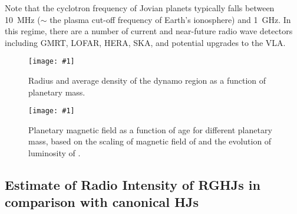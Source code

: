 \documentclass[iop,numberedappendix,apj]{emulateapj}
\def\memoDS#1{\color{blue}$[${\bf #1}$]$ \color{black}}
\def\plotoneh#1{\centering \leavevmode
\texttt{[image: \#1]}}
\begin{document}
Note that the cyclotron frequency of Jovian planets typically falls between 10~MHz ($\sim $ the plasma cut-off frequency of Earth's ionosphere) and 1~GHz. 
In this regime, there are a number of current and near-future radio wave detectors including GMRT, 
LOFAR, HERA, SKA, and potential upgrades to the VLA. 



\begin{figure}[htbp]
   \plotoneh{fig1_linear.pdf}
   \caption{Radius and average density of the dynamo region as a function of planetary mass. }
  \label{fig:planetaryB_pre}
\end{figure}

\begin{figure}[htbp]
   \plotoneh{fig2_Christensen.pdf}
   \caption{Planetary magnetic field as a function of age for different planetary mass, based on the scaling of magnetic field of \citet{christensen2010} and the evolution of luminosity of \citet{burrows_et_al2001}.} %
  \label{fig:planetaryB}
\end{figure}


\subsection{Estimate of Radio Intensity of RGHJs in comparison with canonical HJs}
\label{ss:brightness}
\end{document}
